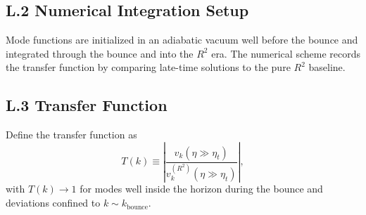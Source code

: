 \subsection{L.2 Numerical Integration Setup}
Mode functions are initialized in an adiabatic vacuum well before the bounce and integrated
through the bounce and into the $R^2$ era. The numerical scheme records the transfer function
by comparing late-time solutions to the pure $R^2$ baseline.

\subsection{L.3 Transfer Function}
Define the transfer function as
\begin{equation}
    T(k) \equiv \left|\frac{v_k(\eta\gg \eta_t)}{v_k^{(R^2)}(\eta\gg \eta_t)}\right|,
\end{equation}
with $T(k)\to 1$ for modes well inside the horizon during the bounce and deviations confined
to $k\sim k_{\text{bounce}}$.

\TFPTTransferFunctionPlot

